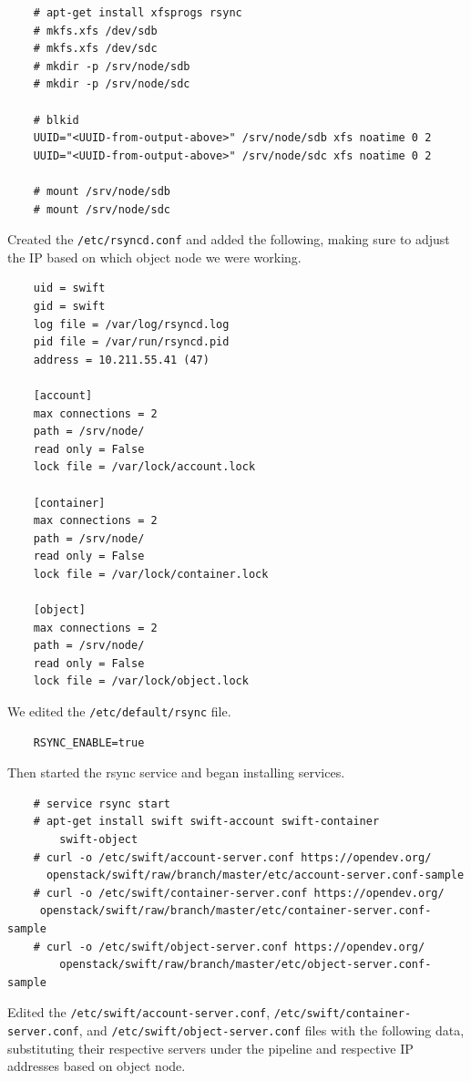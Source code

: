 \documentclass{article}
\begin{document}
\begin{verbatim}
    # apt-get install xfsprogs rsync
    # mkfs.xfs /dev/sdb
    # mkfs.xfs /dev/sdc
    # mkdir -p /srv/node/sdb
    # mkdir -p /srv/node/sdc

    # blkid
    UUID="<UUID-from-output-above>" /srv/node/sdb xfs noatime 0 2
    UUID="<UUID-from-output-above>" /srv/node/sdc xfs noatime 0 2

    # mount /srv/node/sdb
    # mount /srv/node/sdc
\end{verbatim}

Created the \texttt{/etc/rsyncd.conf} and added the following, making sure to adjust the IP based on which object node we were working.

\begin{verbatim}
    uid = swift
    gid = swift
    log file = /var/log/rsyncd.log
    pid file = /var/run/rsyncd.pid
    address = 10.211.55.41 (47)

    [account]
    max connections = 2
    path = /srv/node/
    read only = False
    lock file = /var/lock/account.lock

    [container]
    max connections = 2
    path = /srv/node/
    read only = False
    lock file = /var/lock/container.lock

    [object]
    max connections = 2
    path = /srv/node/
    read only = False
    lock file = /var/lock/object.lock
\end{verbatim}
We edited the \texttt{/etc/default/rsync} file.

\begin{verbatim}
    RSYNC_ENABLE=true
\end{verbatim}

Then started the rsync service and began installing services.

\begin{verbatim}
    # service rsync start
    # apt-get install swift swift-account swift-container
        swift-object
    # curl -o /etc/swift/account-server.conf https://opendev.org/
      openstack/swift/raw/branch/master/etc/account-server.conf-sample
    # curl -o /etc/swift/container-server.conf https://opendev.org/
     openstack/swift/raw/branch/master/etc/container-server.conf-sample
    # curl -o /etc/swift/object-server.conf https://opendev.org/
        openstack/swift/raw/branch/master/etc/object-server.conf-sample
\end{verbatim}
Edited the \texttt{/etc/swift/account-server.conf}, \texttt{/etc/swift/container-server.conf}, and \texttt{/etc/swift/object-server.conf} files with the following data, substituting their respective servers under the pipeline and respective IP addresses based on object node.
\end{document}
